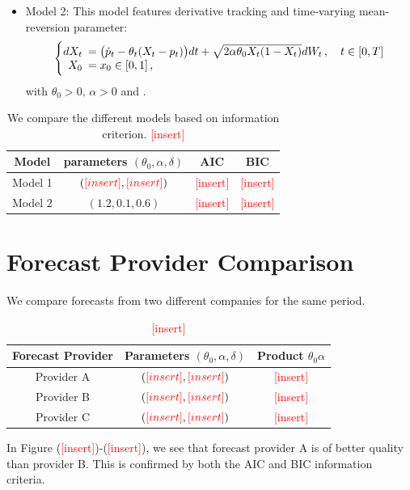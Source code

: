 \documentclass[11pt]{article}
\theoremstyle{definition}
\newcommand{\add}{\textcolor{red}{[insert]}}
\begin{document}
\begin{itemize}
  \item Model 2: This model features derivative tracking and time-varying mean-reversion parameter:  
\begin{equation}
  \left\{
  \begin{array}{@{}rl@{}}
    dX_t \!\!\!&= \big(\dot{p}_t  - \theta_t (X_t - p_t) \big) dt +\sqrt{2 \alpha \theta_0 X_t (1 - X_t)} dW_t\,, \quad t \in [0,T]  \\
   X_0  \!\!\!&=  x_0\in [0,1] \,,
 \end{array}\right.  \label{Model2}
\end{equation}
 with $\theta_0 > 0, \, \alpha > 0$ and .
\end{itemize}

\begin{table}[H]
\centering
\begin{tabular}{cccc}
\toprule
Model   &  parameters $(\theta_0, \alpha,\delta)$   & AIC & BIC \\ \midrule
Model 1 &  $(\add,\add) $    &  \add   &  \add   \\
Model 2 &   $(1.2,0.1,0.6)$   &  \add   &   \add    \\ 
\bottomrule
\end{tabular}
\caption{We compare the different models based on information criterion. \add }
\label{tab:model_comparison}
\end{table}

\section{Forecast Provider Comparison} \label{Section_6}
We compare forecasts from two different companies for the same period.
\begin{table}[H]
\centering
\begin{tabular}{ccc}
\toprule
Forecast Provider & Parameters $(\theta_0, \alpha,\delta)$ & Product $\theta_0\alpha$ \\ \midrule
Provider A  &  $(\add,\add)$      &  \add    \\
Provider B  & $(\add,\add) $  &  \add \\ 
Provider C  & $(\add,\add) $  &  \add \\ 
\bottomrule
\end{tabular}
\caption{\add}
\label{tab:forcast_comparison}
\end{table}
In Figure (\add)-(\add), we see that forecast provider A is of better quality than provider B. This is confirmed by both the AIC and BIC information criteria.
\end{document}
